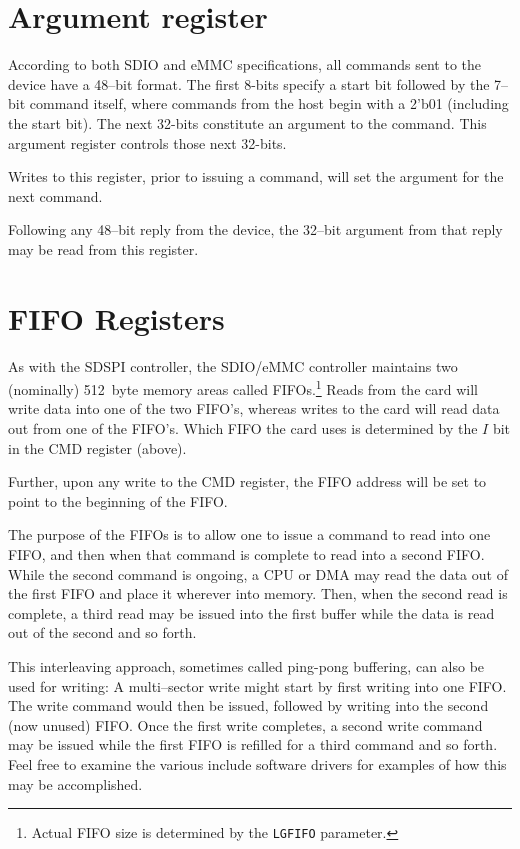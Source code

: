 \documentclass{gqtekspec}
\begin{document}
\section{Argument register}
According to both SDIO and eMMC specifications, all commands sent to the
device have a 48--bit format.  The first 8-bits specify a start bit followed
by the 7--bit command itself, where commands from the host begin with a
2'b01 (including the start bit).  The next 32-bits constitute an argument
to the command.  This argument register controls those next 32-bits.

Writes to this register, prior to issuing a command, will set the argument
for the next command.

Following any 48--bit reply from the device, the 32--bit argument from that
reply may be read from this register.
\section{FIFO Registers}	%
As with the SDSPI controller, the SDIO/eMMC controller maintains two (nominally)
512~byte memory areas called FIFOs.\footnote{Actual FIFO size is determined
by the {\tt LGFIFO} parameter.}  Reads from the card will write data into one
of the two FIFO's, whereas writes to the card will read data out from one of
the FIFO's.  Which FIFO the card uses is determined by the $I$ bit in the CMD
register (above).

Further, upon any write to the CMD register, the FIFO address will be set
to point to the beginning of the FIFO.

The purpose of the FIFOs is to allow one to issue a command to read into one
FIFO, and then when that command is complete to read into a second FIFO.  While
the second command is ongoing, a CPU or DMA may read the data out of the first
FIFO and place it wherever into memory.  Then, when the second read is complete,
a third read may be issued into the first buffer while the data is read out of
the second and so forth.

This interleaving approach, sometimes called ping-pong buffering, can also be
used for writing: A multi--sector write might start by first writing into one
FIFO.  The write command would then be issued, followed by writing into the
second (now unused) FIFO.  Once the first write completes, a second write
command may be issued while the first FIFO is refilled for a third command
and so forth.  Feel free to examine the various include software drivers for
examples of how this may be accomplished.
\end{document}
